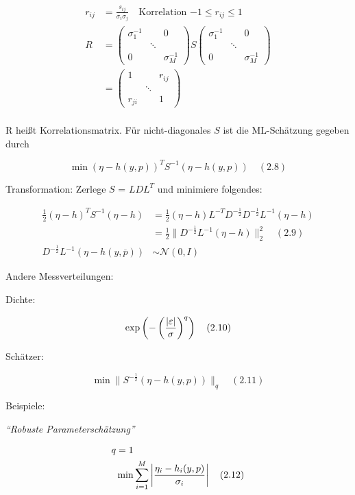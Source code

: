 \begin{align*}
r_{ij} &= \frac{s_{ij}}{\sigma_i\sigma_j} \quad \text{Korrelation $-1 \leq r_{ij} \leq 1$} \\
R &= \begin{pmatrix} \sigma_1^{-1} & & 0 \\ & \ddots & \\ 0 & & \sigma_M^{-1} \end{pmatrix} S \begin{pmatrix} \sigma_1^{-1} & & 0 \\ & \ddots & \\ 0 & & \sigma_M^{-1} \end{pmatrix} \\
&= \begin{pmatrix} 1 & & r_{ij} \\ & \ddots & \\ r_{ji} & & 1 \end{pmatrix} \\
\end{align*}

R heißt Korrelationsmatrix. Für nicht-diagonales $S$ ist die ML-Schätzung gegeben durch

\[ \min (\eta-h(y,p))^T S^{-1} (\eta-h(y,p)) \quad (2.8)\]

Transformation: Zerlege $S$ = $LDL^T$ und minimiere folgendes:

\begin{align*}
\frac 12 (\eta -h)^T S^{-1} (\eta-h) &= \frac 12 (\eta-h)L^{-T} D^{-\frac 12} D^{-\frac 12} L^{-1} (\eta-h) \\
&= \frac 12 \|D^{-\frac 12} L^{-1}(\eta -h)\|_2^2 \quad (2.9) \\
D^{-\frac 12} L^{-1} (\eta -h(y,\overline p)) &\sim \mathcal N(0,I)
\end{align*}

Andere Messverteilungen:

Dichte:

\[\exp\left(-\left(\frac{|\varepsilon|}{\sigma}\right)^q\right) \quad (2.10)\]

Schätzer:

\[ \min \|S^{-\frac 12} (\eta-h(y,p)) \|_q \quad (2.11)\]

Beispiele:

\emph{"`Robuste Parameterschätzung"'}

\begin{align*}
q &= 1 \\
& \min \sum_{i=1}^M \left| \frac{\eta_i-h_i(y,p)}{\sigma_i} \right| \quad (2.12)
\end{align*}


